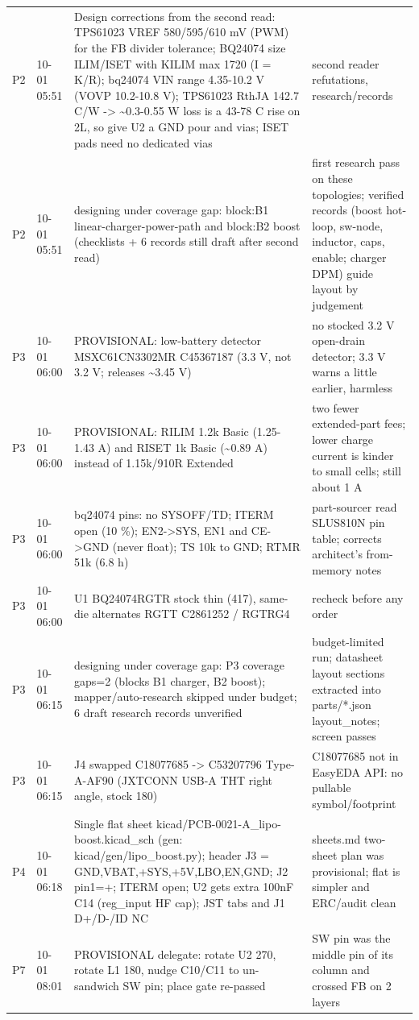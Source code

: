 \documentclass[11pt]{article}
\begin{document}
{\begin{longtable}{lp{1.6cm}p{6.2cm}p{6.2cm}}
P2 & 10-01 05:51 & Design corrections from the second read: TPS61023 VREF 580/595/610 mV (PWM) for the FB divider tolerance; BQ24074 size ILIM/ISET with KILIM max 1720 (I = K/R); bq24074 VIN range 4.35-10.2 V (VOVP 10.2-10.8 V); TPS61023 RthJA 142.7 C/W -\textgreater{} \textasciitilde{}0.3-0.55 W loss is a 43-78 C rise on 2L, so give U2 a GND pour and vias; ISET pads need no dedicated vias & second reader refutations, research/records \\
P2 & 10-01 05:51 & designing under coverage gap: block:B1 linear-charger-power-path and block:B2 boost (checklists + 6 records still draft after second read) & first research pass on these topologies; verified records (boost hot-loop, sw-node, inductor, caps, enable; charger DPM) guide layout by judgement \\
P3 & 10-01 06:00 & PROVISIONAL: low-battery detector MSXC61CN3302MR C45367187 (3.3 V, not 3.2 V; releases \textasciitilde{}3.45 V) & no stocked 3.2 V open-drain detector; 3.3 V warns a little earlier, harmless \\
P3 & 10-01 06:00 & PROVISIONAL: RILIM 1.2k Basic (1.25-1.43 A) and RISET 1k Basic (\textasciitilde{}0.89 A) instead of 1.15k/910R Extended & two fewer extended-part fees; lower charge current is kinder to small cells; still about 1 A \\
P3 & 10-01 06:00 & bq24074 pins: no SYSOFF/TD; ITERM open (10 \%); EN2-\textgreater{}SYS, EN1 and CE-\textgreater{}GND (never float); TS 10k to GND; RTMR 51k (6.8 h) & part-sourcer read SLUS810N pin table; corrects architect's from-memory notes \\
P3 & 10-01 06:00 & U1 BQ24074RGTR stock thin (417), same-die alternates RGTT C2861252 / RGTRG4 & recheck before any order \\
P3 & 10-01 06:15 & designing under coverage gap: P3 coverage gaps=2 (blocks B1 charger, B2 boost); mapper/auto-research skipped under budget; 6 draft research records unverified & budget-limited run; datasheet layout sections extracted into parts/{*}.json layout\_notes; screen passes \\
P3 & 10-01 06:15 & J4 swapped C18077685 -\textgreater{} C53207796 Type-A-AF90 (JXTCONN USB-A THT right angle, stock 180) & C18077685 not in EasyEDA API: no pullable symbol/footprint \\
P4 & 10-01 06:18 & Single flat sheet kicad/PCB-0021-A\_lipo-boost.kicad\_sch (gen: kicad/gen/lipo\_boost.py); header J3 = GND,VBAT,+SYS,+5V,LBO,EN,GND; J2 pin1=+; ITERM open; U2 gets extra 100nF C14 (reg\_input HF cap); JST tabs and J1 D+/D-/ID NC & sheets.md two-sheet plan was provisional; flat is simpler and ERC/audit clean \\
P7 & 10-01 08:01 & PROVISIONAL delegate: rotate U2 270, rotate L1 180, nudge C10/C11 to un-sandwich SW pin; place gate re-passed & SW pin was the middle pin of its column and crossed FB on 2 layers \\
\hline
\end{longtable}
}
\end{document}
